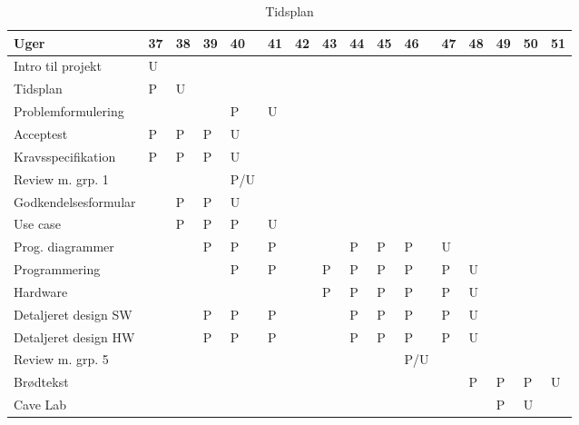 \documentclass[landscape, 12pt, letterpaper]{article}
\begin{document}
\begin{table}[]
\centering
\caption{Tidsplan}
\label{my-label}
\begin{tabular}{|l|l|l|l|l|l|l|l|l|l|l|l|l|l|l|l|}
\hline
Uger                    & 37 & 38 & 39 & 40 & 41 & 42 & 43 & 44 & 45 & 46 & 47 & 48 & 49 & 50 & 51 \\ \hline
Intro til projekt       & U  &    &    &    &    &    &    &    &    &    &    &    &    &    &    \\ \hline
Tidsplan                & P  & U  &    &    &    &    &    &    &    &    &    &    &    &    &    \\ \hline
Problemformulering      &    &    &    & P  & U  &    &    &    &    &    &    &    &    &    &    \\ \hline
Acceptest               & P  & P  & P  & U  &    &    &    &    &    &    &    &    &    &    &    \\ \hline
Kravsspecifikation      & P  &  P & P  &  U &    &    &    &    &    &    &    &    &    &    &    \\ \hline
Review m. grp. 1        &    &    &    & P/U&    &    &    &    &    &    &    &    &    &    &    \\ \hline
Godkendelsesformular    &    &  P & P  & U  &    &    &    &    &    &    &    &    &    &    &    \\ \hline
Use case                &    &  P & P  & P  & U  &    &    &    &    &    &    &    &    &    &    \\ \hline
Prog. diagrammer        &    &    &  P & P  & P  &    &    & P  & P  & P  & U  &    &    &    &    \\ \hline
Programmering           &    &    &    & P  & P  &    & P  & P  & P  & P  & P  & U  &    &    &    \\ \hline
Hardware                &    &    &    &    &    &    & P  & P  & P  & P  & P  & U  &    &    &    \\ \hline
Detaljeret design SW    &    &    &  P &  P & P  &    &    & P  & P  &  P & P  & U  &    &    &    \\ \hline
Detaljeret design HW    &    &    &  P &  P & P  &    &    & P  & P  &  P & P  & U  &    &    &    \\ \hline
Review m. grp. 5        &    &    &    &    &    &    &    &    &    & P/U&    &    &    &    &    \\ \hline
Brødtekst               &    &    &    &    &    &    &    &    &    &    &    &  P & P  & P  &  U \\ \hline
Cave Lab                &    &    &    &    &    &    &    &    &    &    &    &    & P  & U  &    \\ \hline

\end{tabular}
\end{table}
\end{document}

